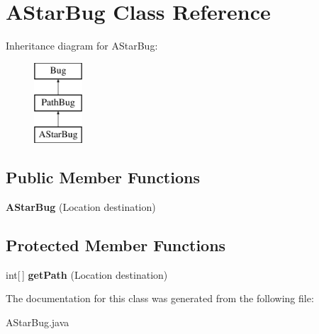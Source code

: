 \hypertarget{classAStarBug}{\section{A\-Star\-Bug Class Reference}
\label{classAStarBug}
}
Inheritance diagram for A\-Star\-Bug\-:\begin{figure}[H]
\begin{center}
\leavevmode
\includegraphics[height=3.000000cm]{classAStarBug}
\end{center}
\end{figure}
\subsection*{Public Member Functions}
\begin{DoxyCompactItemize}
\item 
\hypertarget{classAStarBug_adce292fcb395242f566e6b194d6385ac}{{\bfseries A\-Star\-Bug} (Location destination)}\label{classAStarBug_adce292fcb395242f566e6b194d6385ac}

\end{DoxyCompactItemize}
\subsection*{Protected Member Functions}
\begin{DoxyCompactItemize}
\item 
\hypertarget{classAStarBug_a3a806b7fad5707103c5ad3fb3895a5b3}{int\mbox{[}$\,$\mbox{]} {\bfseries get\-Path} (Location destination)}\label{classAStarBug_a3a806b7fad5707103c5ad3fb3895a5b3}

\end{DoxyCompactItemize}


The documentation for this class was generated from the following file\-:\begin{DoxyCompactItemize}
\item 
A\-Star\-Bug.\-java\end{DoxyCompactItemize}
